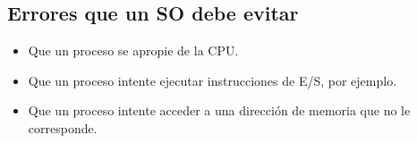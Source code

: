 \subsection{Errores que un SO debe evitar}
\begin{itemize}
    \item Que un proceso se apropie de la CPU.
    \item Que un proceso intente ejecutar instrucciones de E/S, por ejemplo.
    \item Que un proceso intente acceder a una dirección de memoria que no le corresponde.
\end{itemize}

\pagebreak
